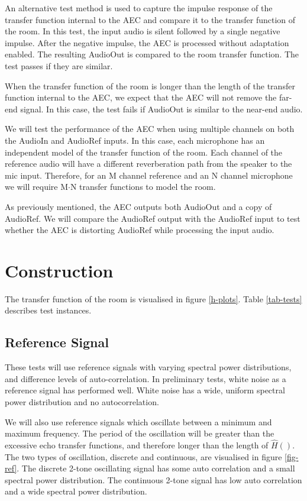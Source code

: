 \documentclass[a4paper,10pt]{article}
\begin{document}
An alternative test method is used to capture the impulse response of the
transfer function internal to the AEC and compare it to the transfer function of
the room. In this test, the input audio is silent followed by a single negative
impulse. After the negative impulse, the AEC is processed without adaptation
enabled. The resulting AudioOut is compared to the room transfer function.
The test passes if they are similar.

When the transfer function of the room is longer than the length of the transfer
function internal to the AEC, we expect that the AEC will not remove the far-end
signal. In this case, the test fails if AudioOut is similar to the near-end
audio.

We will test the performance of the AEC when using multiple channels on both the
AudioIn and AudioRef inputs. In this case, each microphone has an independent
model of the transfer function of the room. Each channel of the reference audio
will have a different reverberation path from the speaker to the mic input.
Therefore, for an M channel reference and an N channel microphone we will
require M$\cdot$N transfer functions to model the room.

As previously mentioned, the AEC outputs both AudioOut and a copy of AudioRef.
We will compare the AudioRef output with the AudioRef input to test whether the
AEC is distorting AudioRef while processing the input audio.

\section{Construction}

The transfer function of the room is visualised in figure \ref{h-plots}. Table
\ref{tab-tests} describes test instances.

\subsection{Reference Signal}

These tests will use reference signals with varying spectral power
distributions, and difference levels of auto-correlation. In preliminary tests,
white noise as a reference signal has performed well.  White noise has a wide,
uniform spectral power distribution and no autocorrelation.

We will also use reference signals which oscillate between a minimum and maximum
frequency. The period of the oscillation will be greater than the excessive echo
transfer functions, and therefore longer than the length of $\hat{H}()$. The
two types of oscillation, discrete and continuous, are visualised in figure
\ref{fig-ref}. The discrete 2-tone oscillating signal has some auto correlation
and a small spectral power distribution. The continuous 2-tone signal has low
auto correlation and a wide spectral power distribution.
\end{document}

